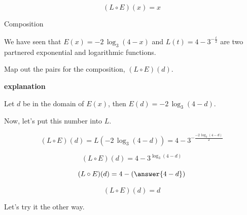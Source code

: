 \documentclass{ximera}
\begin{document}
\[   (L \circ E)(x) = x        \]




\begin{example}  Composition

We have seen that $E(x) = -2 \, \log_3(4-x)$ and $L(t) = 4 - 3^{-\frac{t}{2}}$ are two partnered exponential and logarithmic functions. 


Map out the pairs for the composition, $(L \circ E)(d)$.

\textbf{\textcolor{red!75!green}{explanation}} 


Let $d$ be in the domain of $E(x)$, then $E(d) = -2 \, \log_3(4-d)$. 

Now, let's put this number into $L$. 



\[    (L \circ E)(d)  =  L(-2 \, \log_3(4-d)) = 4 - 3^{-\frac{-2 \, \log_3(4-d)}{2}}              \]


\[    (L \circ E)(d)  =  4 - 3^{ \log_3(4-d)}              \]


\[    (L \circ E)(d)  =  4 - \left( \answer{4-d} \right)             \]


\[    (L \circ E)(d)  = d             \]



\end{example}




Let's try it the other way.










\end{document}
